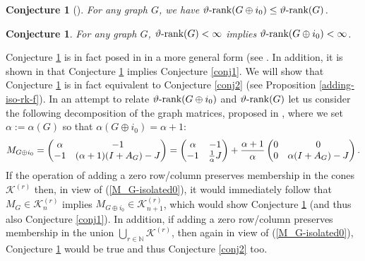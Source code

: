 \documentclass[11pt]{article}
\newcommand{\oN}{{\mathbb N}}
\newtheorem{conjecture}[theorem]{Conjecture}
\numberwithin{equation}{section}
\newcommand{\MK}{{\mathcal K}}
\newcommand{\rrank}{\vartheta\text{\rm -rank}}
\begin{document}
\begin{conjecture}[\cite{GL2007}]\label{conjisolated}
For any graph $G$, we have $\rrank(G\oplus i_0)\le \rrank (G)$.
\end{conjecture}
\begin{conjecture}\label{conjfinite}
For any graph $G$, $\rrank(G)<\infty$  implies  $\rrank(G\oplus i_0)<\infty$.
\end{conjecture}
Conjecture \ref{conjisolated}  is  in fact posed in \cite{GL2007} in a more general form (see \cite[Conjecture 4]{GL2007}.
 In addition,  it is shown in \cite{GL2007}  that Conjecture \ref{conjisolated} implies Conjecture \ref{conj1}.
We will show that Conjecture \ref{conjfinite} is in fact equivalent to  Conjecture \ref{conj2} (see Proposition \ref{adding-iso-rk-f}). 
In an attempt to relate  $\rrank(G\oplus i_0)$ and $\rrank(G)$ let us consider the following decomposition of the graph matrices,   proposed  in \cite{GL2007}, where we set  $\alpha:=\alpha(G)$ so that $\alpha(G\oplus i_0)=\alpha+1$:
\begin{equation}\label{M_G-isolated0}
M_{G\oplus i_0}
=\left(\begin{matrix} \alpha  & -1 \cr -1 & (\alpha+1) (I+A_{G})-J\end{matrix}\right)
= 
\left(\begin{matrix} \alpha  & -1 \cr -1 & {1\over \alpha}J\end{matrix}\right)
+
{\alpha+1\over \alpha}
\left(\begin{matrix} 0 & 0 \cr 0 & \alpha(I+A_{G})-J\end{matrix}\right).
\end{equation}
If the operation of adding a zero row/column  preserves  membership in the cones $\MK^{(r)}$ then, in view of  (\ref{M_G-isolated0}), it would immediately follow that 
$M_G\in \mathcal K^{(r)}_n$ implies $M_{G\oplus i_0}\in \mathcal K^{(r)}_{n+1}$, which would show Conjecture \ref{conjisolated} (and thus also Conjecture \ref{conj1}). In addition, if adding a zero row/column  preserves  membership in the union $\bigcup_{r\in\oN}\mathcal K^{(r)}$, then again in view of (\ref{M_G-isolated0}), Conjecture \ref{conjfinite} would be true and thus Conjecture \ref{conj2} too.
\end{document}
